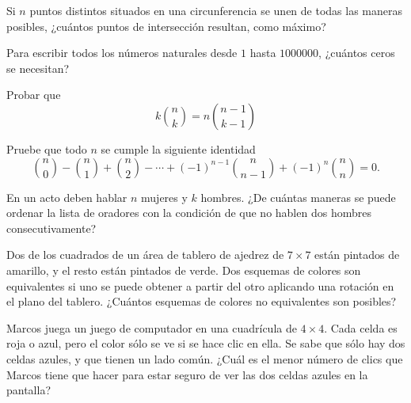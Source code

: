 \begin{problema}
Si $n$ puntos distintos situados en una circunferencia se unen de todas las maneras posibles, ¿cuántos puntos de intersección resultan, como máximo?
\end{problema}

\begin{problema}
Para escribir todos los números naturales desde $1$ hasta $1000000$, ¿cuántos ceros se necesitan?
\end{problema}

\begin{problema}
    Probar que 
    \[k\binom{n}{k}=n\binom{n-1}{k-1}\]
\end{problema}

\begin{problema}
Pruebe que todo $n$ se cumple la siguiente identidad $$\binom{n}{0}-\binom{n}{1}+\binom{n}{2}-\cdots +(-1)^{n-1}\binom{n}{n-1}+(-1)^n\binom{n}{n}=0.$$    
\end{problema}

\begin{problema}
En un acto deben hablar $n$ mujeres y $k$ hombres. ¿De cuántas maneras se puede ordenar la lista de oradores con la condición de que no hablen dos hombres consecutivamente?
\end{problema}

\begin{problema}
    Dos de los cuadrados de un área de tablero de ajedrez de $7\times 7$ están pintados de amarillo, y el resto están pintados de verde. Dos esquemas de colores son equivalentes si uno se puede obtener a partir del otro aplicando una rotación en el plano del tablero. ¿Cuántos esquemas de colores no equivalentes son posibles?
\end{problema}


\begin{problema}
Marcos juega un juego de computador en una cuadrícula de $4\times 4$. Cada celda es roja o azul, pero el color sólo se ve si se hace clic en ella. Se sabe que sólo hay dos celdas azules, y que tienen un lado común.
¿Cuál es el menor número de clics que Marcos tiene que hacer para estar seguro de ver las dos celdas azules en la pantalla?
\end{problema}

